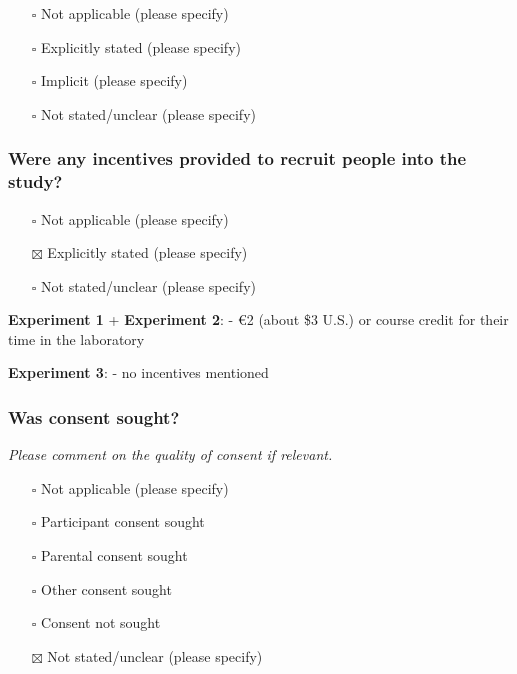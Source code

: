\documentclass[
  doc, a4paper]{apa7}
\providecommand{\tightlist}{%
  \setlength{\itemsep}{0pt}\setlength{\parskip}{0pt}}
\begin{document}
\begin{itemize}
\tightlist
\item[$\square$]
  Not applicable (please specify)
\item[$\square$]
  Explicitly stated (please specify)
\item[$\square$]
  Implicit (please specify)
\item[$\square$]
  Not stated/unclear (please specify)
\end{itemize}

\subsubsection{Were any incentives provided to recruit people into the study?}\label{were-any-incentives-provided-to-recruit-people-into-the-study}

\begin{itemize}
\tightlist
\item[$\square$]
  Not applicable (please specify)
\item[$\boxtimes$]
  Explicitly stated (please specify)
\item[$\square$]
  Not stated/unclear (please specify)
\end{itemize}

\textbf{Experiment 1} + \textbf{Experiment 2}:
- €2 (about \$3 U.S.) or course credit for their time in the laboratory

\textbf{Experiment 3}:
- no incentives mentioned

\subsubsection{Was consent sought?}\label{was-consent-sought}

\emph{Please comment on the quality of consent if relevant.}

\begin{itemize}
\tightlist
\item[$\square$]
  Not applicable (please specify)
\item[$\square$]
  Participant consent sought
\item[$\square$]
  Parental consent sought
\item[$\square$]
  Other consent sought
\item[$\square$]
  Consent not sought
\item[$\boxtimes$]
  Not stated/unclear (please specify)
\end{itemize}
\end{document}
